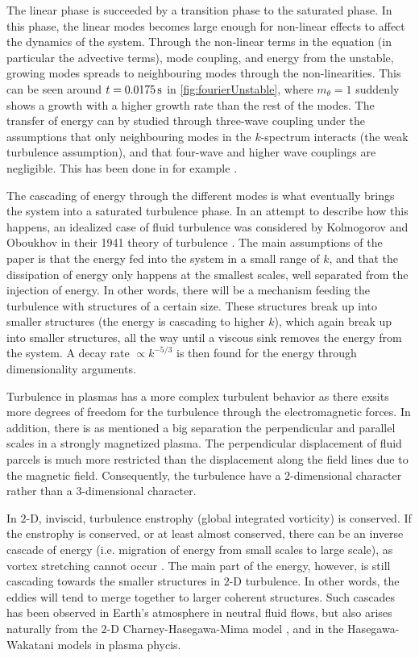 %
The linear phase is succeeded by a transition phase to the saturated phase.
In this phase, the linear modes becomes large enough for non-linear effects to affect the dynamics of the system.
Through the non-linear terms in the equation (in particular the advective terms), mode coupling, and energy from the unstable, growing modes spreads to neighbouring modes through the non-linearities.
This can be seen around $t=0.0175\, \text{s}$ in \cref{fig:fourierUnstable}, where $m_\theta=1$ suddenly shows a growth with a higher growth rate than the rest of the modes.
The transfer of energy can by studied through three-wave coupling under the assumptions that only neighbouring modes in the $k$-spectrum interacts (the weak turbulence assumption), and that four-wave and higher wave couplings are negligible.
This has been done in for example \cite{Ritz1989,Knorr1990}.

The cascading of energy through the different modes is what eventually brings the system into a saturated turbulence phase.
In an attempt to describe how this happens, an idealized case of fluid turbulence was considered by Kolmogorov and Oboukhov in their 1941 theory of turbulence \cite{Kolmogorov1962}.
The main assumptions of the paper is that the energy fed into the system in a small range of $k$, and that the dissipation of energy only happens at the smallest scales, well separated from the injection of energy.
In other words, there will be a mechanism feeding the turbulence with structures of a certain size.
These structures break up into smaller structures (the energy is cascading to higher $k$), which again break up into smaller structures, all the way until a viscous sink removes the energy from the system.
A decay rate $\propto k^{-5/3}$ is then found for the energy through dimensionality arguments.

Turbulence in plasmas has a more complex turbulent behavior as there exsits more degrees of freedom for the turbulence through the electromagnetic forces.
In addition, there is as mentioned a big separation the perpendicular and parallel scales in a strongly magnetized plasma.
The perpendicular displacement of fluid parcels is much more restricted than the displacement along the field lines due to the magnetic field.
Consequently, the turbulence have a $2$-dimensional character rather than a $3$-dimensional character.

In $2$-D, inviscid, turbulence enstrophy (global integrated vorticity) is conserved.
If the enstrophy is conserved, or at least almost conserved, there can be an inverse cascade of energy (i.e. migration of energy from small scales to large scale), as vortex stretching cannot occur \cite{Fjortoft1953}.
The main part of the energy, however, is still cascading towards the smaller structures in $2$-D turbulence.
In other words, the eddies will tend to merge together to larger coherent structures.
Such cascades has been observed in Earth's atmosphere \cite{Smith2002} in neutral fluid flows, but also arises naturally from the $2$-D Charney-Hasegawa-Mima model \cite{Boffetta2002}, and in the Hasegawa-Wakatani \cite{Manz2009} models in plasma phycis.





